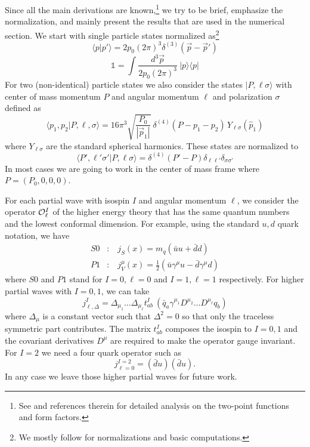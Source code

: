 \documentclass[12pt,letterpaper]{article}
\newcommand{\bra}[1]{\mbox{$\langle #1 |$}}
\newcommand{\ket}[1]{\mbox{$| #1 \rangle$}}
\newcommand{\beq}{\begin{equation}}
\newcommand{\eeq}{\end{equation}}
\newcommand{\beqa}{\begin{eqnarray}}
\newcommand{\eeqa}{\end{eqnarray}}
\newcommand{\cO}{{\cal O}}
\newcommand{\half}{\ensuremath{\frac{1}{2}}}
\begin{document}
   Since all the main derivations are known,\footnote{See \cite{Karateev:2020axc} and references therein for detailed analysis on the two-point functions and form factors.} we try to be brief, emphasize the normalization, and mainly present the results that are used in the numerical section.  We start with single particle states normalized as\footnote{We mostly follow \cite{Peskin:1995ev} for normalizations and basic computations.}
   \beq\label{h6}
   \bra{p}p'\rangle = 2p_0 (2\pi)^3 \delta^{(3)}(\vec{p}-\vec{p}')
   \eeq
   \beq\label{h7}
   \mathbb{1} = \int\frac{d^3\vec{p}}{2p_0 (2\pi)^3}\ \ket{p}\bra{p} 
   \eeq
   For two (non-identical) particle states we also consider the states $\ket{P,\ell\sigma}$ with center of mass momentum $P$ and angular momentum $\ell$ and polarization $\sigma$ defined as
   \beq\label{h8}
   \bra{p_1, p_2} P,\ell,\sigma\rangle = 16\pi^3 \sqrt{\frac{P_0}{|\vec{p}_1|}}\ \delta^{(4)}(P-p_1-p_2)\, Y_{\ell\sigma}(\hat{p}_1)
   \eeq
   where $Y_{\ell\sigma}$ are the standard spherical harmonics. These states are normalized to
\beq\label{h9}
 \bra{P',\ell'\sigma'}P,\ell\sigma\rangle = \delta^{(4)}(P'-P) \delta_{\ell\ell'}\delta_{\sigma\sigma'} 
\eeq
   In most cases we are going to work in the center of mass frame where $P=(P_0,0,0,0)$.   
   
   For each partial wave with isospin $I$ and angular momentum $\ell$, we consider the operator $\cO_\ell^I$ of the higher energy theory that has the same quantum numbers and the lowest conformal dimension. For example, using the standard $u,d$ quark notation, we have
   \begin{subequations}
   	   \beqa
   	S0&:&\ j_S(x)= m_q (\bar{u}u+\bar{d}d)\label{js} \\
   	P1&:&\ j^\mu_V(x) = \half (\bar{u}\gamma^\mu u-\bar{d}\gamma^\mu d)\label{jv}
   	\eeqa 
   \end{subequations}
   where $S0$ and $P1$ stand for $I=0,\ell=0$ and $I=1,\ell=1$ respectively.
  For higher partial waves with $I=0,1$, we can take 
\beq\label{h10}
  j^{I}_{\ell,\Delta} = \Delta_{\mu_1}\ldots\Delta_{\mu_\ell} t^I_{ab}\ (\bar{q}_a  \gamma^{\mu_1} D^{\mu_2}\ldots D^{\mu_\ell} q_b) 
\eeq
where $\Delta_\mu$ is a constant vector such that $\Delta^2=0$ so that only the traceless symmetric part contributes.  The matrix $t^I_{ab}$ composes the isospin to $I=0,1$ and the covariant derivatives $D^\mu$ are required to make the operator gauge invariant. For $I=2$ we need a four quark operator such as 
\beq\label{h11}
j^{I=2}_{\ell=0}=(\bar{d}u)(\bar{d}u).
\eeq 
In any case we leave those higher partial waves for future work. 
\end{document}
